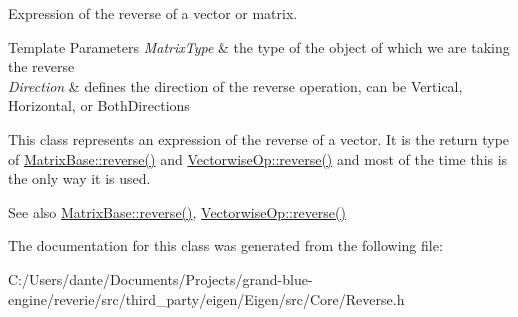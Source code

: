 Expression of the reverse of a vector or matrix. 


\begin{DoxyTemplParams}{Template Parameters}
{\em Matrix\+Type} & the type of the object of which we are taking the reverse \\
\hline
{\em Direction} & defines the direction of the reverse operation, can be Vertical, Horizontal, or Both\+Directions\\
\hline
\end{DoxyTemplParams}
This class represents an expression of the reverse of a vector. It is the return type of \mbox{\hyperlink{class_eigen_1_1_dense_base_a38ea394036d8b096abf322469c80198f}{Matrix\+Base\+::reverse()}} and \mbox{\hyperlink{class_eigen_1_1_vectorwise_op_a094915725d604015221205e8c4ccb993}{Vectorwise\+Op\+::reverse()}} and most of the time this is the only way it is used.

\begin{DoxySeeAlso}{See also}
\mbox{\hyperlink{class_eigen_1_1_dense_base_a38ea394036d8b096abf322469c80198f}{Matrix\+Base\+::reverse()}}, \mbox{\hyperlink{class_eigen_1_1_vectorwise_op_a094915725d604015221205e8c4ccb993}{Vectorwise\+Op\+::reverse()}} 
\end{DoxySeeAlso}


The documentation for this class was generated from the following file\+:\begin{DoxyCompactItemize}
\item 
C\+:/\+Users/dante/\+Documents/\+Projects/grand-\/blue-\/engine/reverie/src/third\+\_\+party/eigen/\+Eigen/src/\+Core/Reverse.\+h\end{DoxyCompactItemize}
